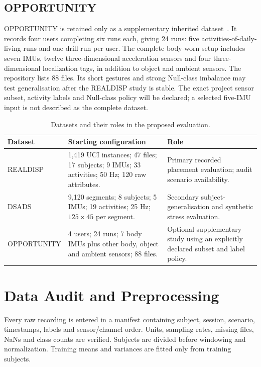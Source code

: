 \documentclass[12pt,a4paper,twoside,openright]{report}
\begin{document}
\subsection{OPPORTUNITY}
OPPORTUNITY is retained only as a supplementary inherited dataset~\cite{opportunity}. It records four users completing six runs each, giving 24 runs: five activities-of-daily-living runs and one drill run per user. The complete body-worn setup includes seven IMUs, twelve three-dimensional acceleration sensors and four three-dimensional localization tags, in addition to object and ambient sensors. The repository lists 88 files. Its short gestures and strong Null-class imbalance may test generalisation after the REALDISP study is stable. The exact project sensor subset, activity labels and Null-class policy will be declared; a selected five-IMU input is not described as the complete dataset.

\begin{table}[hbt!]
\centering
\small
\renewcommand{\arraystretch}{1.3}
\caption{Datasets and their roles in the proposed evaluation.}
\label{tab:datasets}
\begin{tabularx}{\textwidth}{@{}P{0.20\textwidth}P{0.27\textwidth}Y@{}}
\toprule
\textbf{Dataset} & \textbf{Starting configuration} & \textbf{Role} \\
\midrule
REALDISP & 1,419 UCI instances; 47 files; 17 subjects; 9 IMUs; 33 activities; 50 Hz; 120 raw attributes. & Primary recorded placement evaluation; audit scenario availability. \\
DSADS & 9,120 segments; 8 subjects; 5 IMUs; 19 activities; 25 Hz; $125\times45$ per segment. & Secondary subject-generalisation and synthetic stress evaluation. \\
OPPORTUNITY & 4 users; 24 runs; 7 body IMUs plus other body, object and ambient sensors; 88 files. & Optional supplementary study using an explicitly declared subset and label policy. \\
\bottomrule
\end{tabularx}
\end{table}

\section{Data Audit and Preprocessing}
Every raw recording is entered in a manifest containing subject, session, scenario, timestamps, labels and sensor/channel order. Units, sampling rates, missing files, NaNs and class counts are verified. Subjects are divided before windowing and normalization. Training means and variances are fitted only from training subjects.
\end{document}
